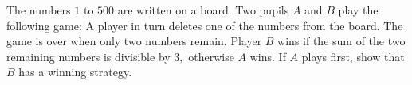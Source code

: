 The numbers $1$ to $500$ are written on a board. Two pupils $A$ and $B$ play the following game: A player in turn deletes one of the numbers from the board. The game is over when only two numbers remain. Player $B$ wins if the sum of the two remaining numbers is divisible by $3,$ otherwise $A$ wins. If $A$ plays ﬁrst, show that $B$ has a winning strategy.